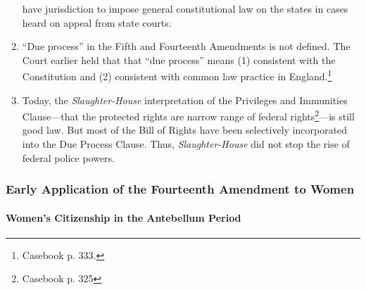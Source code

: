 \begin{enumerate}
    have jurisdiction to impose general constitutional law on the states in 
    cases heard on appeal from state courts.
    \item ``Due process'' in the Fifth and Fourteenth Amendments is not 
    defined. The Court earlier held that that ``due process'' means (1) 
    consistent with the Constitution and (2) consistent with common law 
    practice in England.\footnote{Casebook p. 333.}
    \item Today, the \emph{Slaughter-House} interpretation of the Privileges 
    and Immunities Clause---that the protected rights are narrow range of 
    federal rights\footnote{Casebook p. 325}---is still good law. But most of 
    the Bill of Rights have been selectively incorporated into the Due Process 
    Clause. Thus, \emph{Slaughter-House} did not stop the rise of federal 
    police powers.
\end{enumerate}

\subsubsection{Early Application of the Fourteenth Amendment to Women} 

\paragraph{Women's Citizenship in the Antebellum Period}

